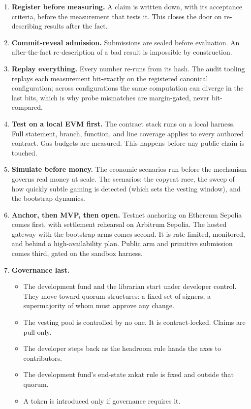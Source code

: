 \documentclass[11pt]{article}
\begin{document}
\begin{enumerate}
\item \textbf{Register before measuring.} A claim is written down,
with its acceptance criteria, before the measurement that tests
it. This closes the door on re-describing results after the fact.
\item \textbf{Commit-reveal admission.} Submissions are sealed
before evaluation. An after-the-fact re-description of a bad
result is impossible by construction.
\item \textbf{Replay everything.} Every number re-runs from its
hash. The audit tooling replays each measurement bit-exactly on
the registered canonical configuration; across configurations
the same computation can diverge in the last bits, which is why
probe mismatches are margin-gated, never bit-compared.
\item \textbf{Test on a local EVM first.} The contract stack runs
on a local harness. Full statement, branch, function, and line
coverage applies to every authored contract. Gas budgets are
measured. This happens before any public chain is touched.
\item \textbf{Simulate before money.} The economic scenarios run
before the mechanism governs real money at scale. The scenarios:
the copycat race, the sweep of how quickly subtle gaming is
detected (which sets the vesting window), and the bootstrap
dynamics.
\item \textbf{Anchor, then MVP, then open.} Testnet anchoring on
Ethereum Sepolia comes first, with settlement rehearsal on
Arbitrum Sepolia. The hosted gateway with the bootstrap arms
comes second. It is rate-limited, monitored, and behind a
high-availability plan. Public arm and primitive submission comes
third, gated on the sandbox harness.
\item \textbf{Governance last.}
\begin{itemize}
\item The development fund and the librarian start under
developer control. They move toward quorum structures: a fixed
set of signers, a supermajority of whom must approve any change.
\item The vesting pool is controlled by no one. It is
contract-locked. Claims are pull-only.
\item The developer steps back as the headroom rule hands the
axes to contributors.
\item The development fund's end-state zakat rule is fixed and
outside that quorum.
\item A token is introduced only if governance requires it.
\end{itemize}
\end{enumerate}
\end{document}
